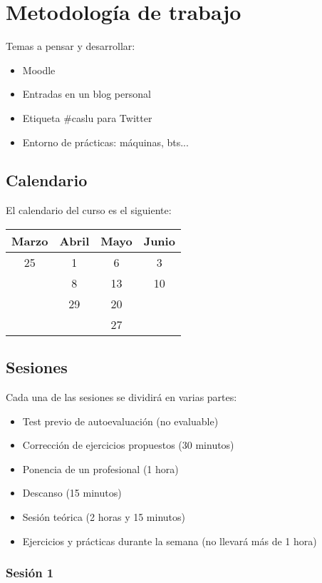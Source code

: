 \documentclass[a4paper]{article}
\begin{document}
  \section{Metodología de trabajo}
    Temas a pensar y desarrollar:
    \begin{itemize}
      \item Moodle
      \item Entradas en un blog personal
      \item Etiqueta \#caslu para Twitter
      \item Entorno de prácticas: máquinas, bts...
    \end{itemize}
    \subsection{Calendario}
    El calendario del curso es el siguiente: 

\medskip

    \begin{tabular}{| c | c | c | c |}
      \hline
      Marzo & Abril & Mayo & Junio \\
      \hline
      25 & 1 & 6 & 3 \\
      & 8 & 13 & 10 \\
      & 29 & 20 & \\
      & & 27 & \\
      \hline
    \end{tabular}

    \subsection{Sesiones}
      Cada una de las sesiones se dividirá en varias partes:
      \begin{itemize}
        \item Test previo de autoevaluación (no evaluable)
        \item Corrección de ejercicios propuestos (30 minutos)
        \item Ponencia de un profesional (1 hora)
        \item Descanso (15 minutos)
        \item Sesión teórica (2 horas y 15 minutos)
        \item Ejercicios y prácticas durante la semana (no llevará más de 1 hora)
      \end{itemize}

      \subsubsection{Sesión 1}
\end{document}
